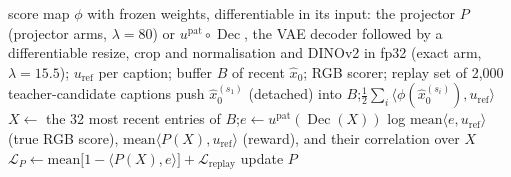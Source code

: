 \documentclass[11pt,a4paper]{article}
\DeclareMathOperator{\Dec}{Dec}
\begin{document}
\begin{algorithm}[H]
\caption{\textsc{Reward} and \textsc{MonitorAndRefresh} (reward arms only)}
\label{alg:reward}
\begin{algorithmic}[1]
\Require score map $\phi$ with frozen weights, differentiable in its input: the projector $P$ (projector arms, $\lambda=80$) or $u^{\mathrm{pat}}\circ\Dec$, the VAE decoder followed by a differentiable resize, crop and normalisation and DINOv2 in fp32 (exact arm, $\lambda=15.5$); $u_{\mathrm{ref}}$ per caption; buffer $B$ of recent $\hat{x}_0$; RGB scorer; replay set of 2,000 teacher-candidate captions
 
  \State push $\hat{x}_0^{(s_1)}$ (detached) into $B$;\quad \Return $\frac12\sum_{i}\langle \phi(\hat{x}_0^{(s_i)}),u_{\mathrm{ref}}\rangle$ 
\EndProcedure
{}
  \State $X\gets$ the 32 most recent entries of $B$;\quad $e\gets u^{\mathrm{pat}}(\Dec(X))$ 
  \State log $\mathrm{mean}\langle e,u_{\mathrm{ref}}\rangle$ (true RGB score), $\mathrm{mean}\langle P(X),u_{\mathrm{ref}}\rangle$ (reward), and their correlation over $X$ 
     
      \State $\mathcal{L}_P\gets\mathrm{mean}\big[1-\langle P(X),e\rangle\big]+\mathcal{L}_{\text{replay}}$ 
      \State update $P$
    \EndFor
  \EndIf
\EndProcedure
\end{algorithmic}
\end{algorithm}
\end{document}
